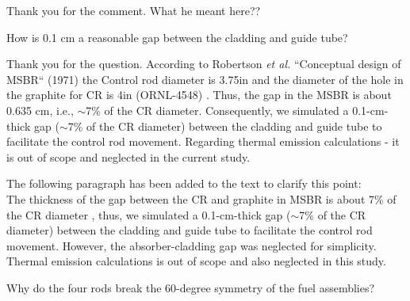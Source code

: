 \documentclass[answers,11pt]{exam}
\begin{document}
\begin{questions}
\begin{solution}
              Thank you for the comment. What he meant here?? 
              
               
               
                
                
                
        \end{solution}

        \question How is 0.1 cm a reasonable gap between the cladding and guide tube?
        \begin{solution}
        	
Thank you for the question. According to Robertson \emph{et al.} ``Conceptual design of MSBR`` (1971) the Control rod diameter is 3.75in and the diameter of the hole in the graphite for CR is 4in (ORNL-4548) \cite{robertson_conceptual_1971}. Thus, the gap in the MSBR is about 0.635 cm, i.e., $\sim$7\% of the CR diameter. Consequently, we simulated a 0.1-cm-thick gap ($\sim$7\% of the CR diameter) between the cladding and guide tube to facilitate the control rod movement. Regarding thermal emission calculations - it is out of scope and neglected in the current study.

The following paragraph has been added to the text to clarify this point:\\

The thickness of the gap between the CR and graphite in MSBR is about 7\% of the CR diameter \cite{robertson_conceptual_1971}, thus, we simulated a 0.1-cm-thick gap ($\sim$7\% of the CR diameter) between the cladding and guide tube to facilitate the control rod movement. However, the absorber-cladding gap was neglected for simplicity. Thermal emission calculations is out of scope and also neglected in this study.



        \end{solution}

        \question Why do the four rods break the 60-degree symmetry of the fuel assemblies?
        

\end{questions}
\end{document}
